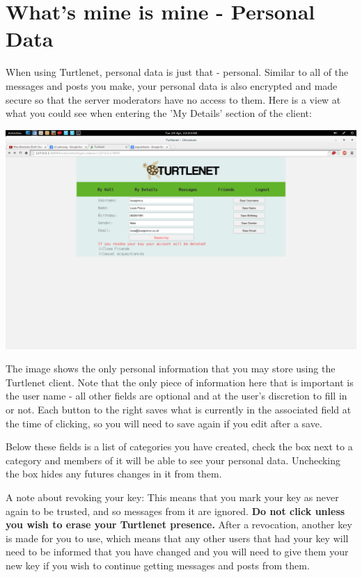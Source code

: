 \section{What's mine is mine - Personal Data}
When using Turtlenet, personal data is just that - personal. Similar to all of
the messages and posts you make, your personal data is also encrypted and made
secure so that the server moderators have no access to them. Here is a view at
what you could see when entering the 'My Details' section of the client:

\includegraphics[scale=0.2]{screenshots/Screenshot from 2014-04-29 22-43-08}

The image shows the only personal information that you may store using the
Turtlenet client. Note that the only piece of information here that is 
important is the user name - all other fields are optional and at the user's
discretion to fill in or not. Each button to the right saves what is currently
in the associated field at the time of clicking, so you will need to save again
if you edit after a save.

Below these fields is a list of categories you have created, check the box next
to a category and members of it will be able to see your personal data.
Unchecking the box hides any futures changes in it from them.

A note about revoking your key:  This means that you mark your key as never
again to be trusted, and so messages from it are ignored.
\textbf{Do not click unless you wish to erase your Turtlenet presence.}
After a revocation, another key is made for you to use, which means that any other
users that had your key will need to be informed that you have changed and you
will need to give them your new key if you wish to continue getting messages 
and posts from them.

